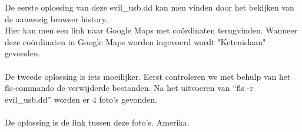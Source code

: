 De eerste oplossing van deze evil\_usb.dd kan men vinden door het bekijken van de aanwezig browser history.\\
Hier kan men een link naar Google Maps met co\"ordinaten terugvinden. Wanneer deze co\"ordinaten in Google Maps worden ingevoerd wordt "Ketenislaan" gevonden.\\\\
De tweede oplossing is iets moeilijker. Eerst controleren we met behulp van het fls-commando de verwijderde bestanden. Na het uitvoeren van ``fls -r evil\_usb.dd'' worden er 4 foto's gevonden.\\\\
De oplossing is de link tussen deze foto's. Amerika.